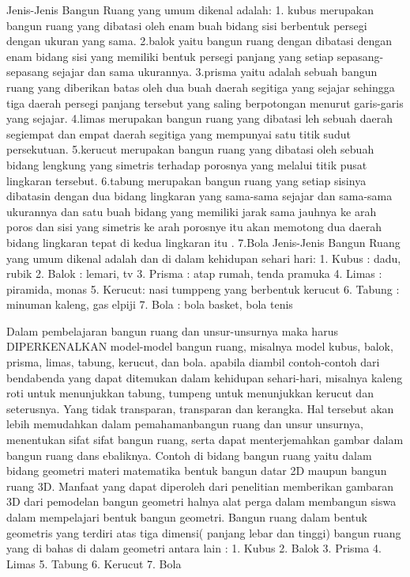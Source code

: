 Jenis-Jenis Bangun Ruang yang umum dikenal adalah:
1.  kubus merupakan bangun ruang yang dibatasi oleh enam buah bidang sisi berbentuk persegi dengan ukuran yang sama.
2.balok yaitu bangun ruang dengan dibatasi dengan enam bidang sisi yang memiliki bentuk persegi panjang yang setiap sepasang-sepasang sejajar dan sama ukurannya.
3.prisma yaitu adalah sebuah bangun ruang yang diberikan batas oleh dua buah daerah segitiga yang sejajar sehingga tiga daerah persegi panjang tersebut yang saling berpotongan menurut garis-garis yang sejajar.
4.limas merupakan bangun ruang yang dibatasi leh sebuah daerah segiempat dan empat daerah segitiga yang mempunyai satu titik sudut persekutuan.
5.kerucut merupakan bangun ruang yang dibatasi oleh sebuah bidang lengkung yang simetris terhadap porosnya yang melalui titik pusat lingkaran tersebut.
6.tabung merupakan bangun ruang yang setiap sisinya dibatasin dengan dua bidang lingkaran yang sama-sama sejajar dan sama-sama ukurannya dan satu buah bidang 
     yang memiliki jarak sama jauhnya ke arah poros dan sisi yang simetris ke arah porosnye itu akan memotong dua daerah bidang lingkaran tepat di kedua lingkaran itu .
7.Bola
Jenis-Jenis Bangun Ruang yang umum dikenal adalah dan di dalam kehidupan sehari hari:
1.   Kubus    : dadu, rubik
2.   Balok    : lemari, tv
3.   Prisma    : atap rumah, tenda pramuka
4.   Limas    : piramida, monas
5.   Kerucut: nasi tumppeng yang berbentuk kerucut
6.   Tabung    : minuman kaleng, gas elpiji
7.   Bola    : bola basket, bola tenis

Dalam pembelajaran bangun ruang dan unsur-unsurnya maka harus DIPERKENALKAN model-model bangun ruang, misalnya model kubus, balok, prisma, limas, tabung, kerucut, dan bola. apabila diambil contoh-contoh dari bendabenda yang dapat ditemukan dalam kehidupan sehari-hari, misalnya kaleng roti untuk menunjukkan tabung, tumpeng untuk menunjukkan kerucut dan seterusnya. Yang tidak transparan, transparan dan kerangka. Hal tersebut akan lebih memudahkan dalam pemahamanbangun ruang dan unsur unsurnya, menentukan sifat sifat bangun ruang, serta dapat menterjemahkan gambar dalam bangun ruang dans ebaliknya.
Contoh di bidang bangun ruang yaitu dalam bidang geometri  materi matematika bentuk bangun datar 2D maupun bangun ruang 3D. 
Manfaat yang dapat diperoleh dari penelitian memberikan gambaran 3D dari pemodelan bangun geometri halnya alat perga dalam membangun siswa dalam mempelajari bentuk bangun geometri.
Bangun ruang dalam bentuk geometris yang terdiri atas tiga dimensi( panjang lebar dan tinggi) bangun ruang yang di bahas di dalam geometri antara lain :
1.    Kubus
2.    Balok 
3.    Prisma
4.    Limas
5.    Tabung
6.    Kerucut
7.    Bola

